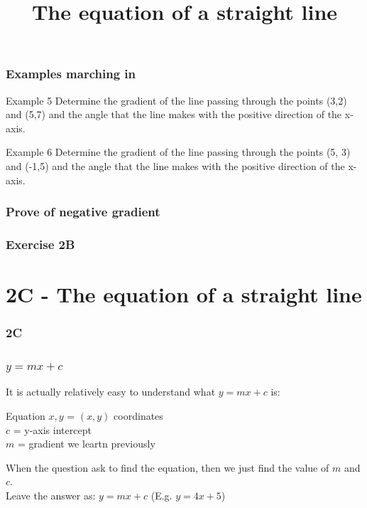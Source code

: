 \documentclass{beamer}
\newcommand{\blank}{\begin{frame}
\end{frame}}
\begin{document}
\begin{frame}[t]
    \frametitle{Examples marching in}
    \begin{block}{Example 5}
        Determine the gradient of the line passing through the points (3,2) and (5,7) and the angle that the line makes with the positive direction of the x-axis.
    \end{block}
    \begin{block}{Example 6}
        Determine the gradient of the line passing through the points (5, 3) and (-1,5) and the
        angle that the line makes with the positive direction of the x-axis.
    \end{block}
\end{frame}
\blank

\begin{frame}
    \frametitle{Prove of negative gradient}
\end{frame}

\begin{frame}
    \frametitle{Exercise 2B}
\end{frame}

\section{2C - The equation of a straight line}
\begin{frame}
    \frametitle{2C}
    \begin{center}
        \title{The equation of a straight line}
        \maketitle
    \end{center}
\end{frame}

\begin{frame}
    \frametitle{$y = mx + c$}
    It is actually relatively easy to understand what $y = mx + c$ is:
    \begin{block}{Equation}
        $x, y$ = $(x,y)$ coordinates\\
        $c$ = y-axis intercept\\
        $m$ = gradient we leartn previously
    \end{block}
    When the question ask to find the equation, then we just find the value of $m$ and $c$.\\
    Leave the answer as: $y = mx + c$ (E.g. $y = 4x + 5$)
\end{frame}
\end{document}
